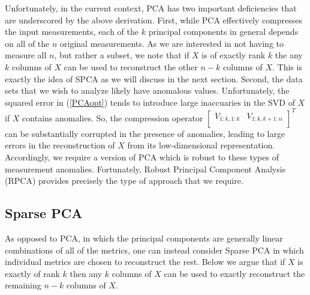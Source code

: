 \documentclass[conference]{IEEEtran}
\begin{document}
Unfortunately, in the current context, PCA has two important deficiencies that are underscored by the above derivation.  First, while PCA effectively compresses the input measurements, each of the $k$ principal components in general depends on all of the $n$ original measurements.   As we are interested in not having to measure all $n$, but rather a subset, we note that if $X$ is of exactly rank $k$ the any $k$ columns of $X$ can be used to reconstruct the other $n-k$ columns of $X$.  This is exactly the idea of SPCA as we will discuss in the next section.
Second, the data sets that we wish to analyze likely have anomalous values.  Unfortunately, the squared error in (\ref{PCAopt}) tends to introduce large inaccuaries in the SVD of $X$ if $X$ contains anomalies.  So, the compression operator $\begin{bmatrix} V_{1:k,1:k} & V_{1:k,k+1:n} \\ \end{bmatrix}^T$ can be substantially corrupted in the presence of anomalies, leading to large errors in the reconstruction of $X$ from its low-dimensional representation.
Accordingly, we require a version of PCA which is robust to these types of measurement anomalies.   Fortunately, Robust Principal Component Analysis (RPCA) \cite{Candes2009,
 Candes2011, Chandrasekaran2009, Cai2010, Paffenroth2012a,Paffenroth2013b} provides precisely the type of approach that we require.   

\subsection{Sparse PCA}\label{SPCA}


As opposed to PCA, in which the principal components are generally linear combinations of all of the metrics, one can instead consider Sparse PCA \cite{htf01} in which individual metrics are chosen to reconstruct the rest. Below we argue that  if $X$ is exactly of rank $k$ then any $k$ columns of $X$ can be used to exactly reconstruct the remaining $n-k$ columns of $X$.
\end{document}
